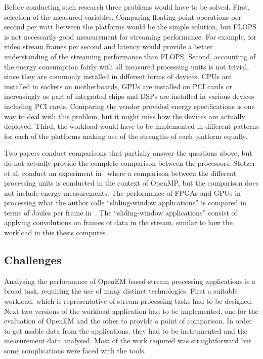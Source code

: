 Before conducting such research three problems would have to be solved. First, selection of the measured variables. Comparing floating point operations per second per watt between the platforms would be the simple solution, but FLOPS is not necessarily good measurement for streaming performance. For example, for video stream frames per second and latency would provide a better understanding of the streaming performance than FLOPS. Second, accounting of the energy consumption fairly with all measured processing units is not trivial, since they are commonly installed in different forms of devices. CPUs are installed in sockets on motherboards, GPUs are installed on PCI cards or increasingly as part of integrated chips and DSPs are installed in various devices including PCI cards. Comparing the vendor provided energy specifications is one way to deal with this problem, but it might miss how the devices are actually deployed. Third, the workload would have to be implemented in different patterns for each of the platforms making use of the strengths of each platform equally.

Two papers conduct comparisons that partially answer the questions above, but do not actually provide the complete comparison between the processors. Stotzer et al. conduct an experiment in~\cite{stotzer2013openmp} where a comparison between the different processing units is conducted in the context of OpenMP, but the comparison does not include energy measurements. The performance of FPGAs and GPUs in processing what the author calls ``sliding-window applications'' is compared in terms of Joules per frame in~\cite{fowers2012performance}. The ``sliding-window applications'' consist of applying convolutions on frames of data in the stream, similar to how the workload in this thesis computes.

\subsection{Challenges}
\label{subsec:challenges}
Analysing the performance of OpenEM based stream processing applications is a broad task, requiring the use of many distinct technologies. First a suitable workload, which is representative of stream processing tasks had to be designed. Next two versions of the workload application had to be implemented, one for the evaluation of OpenEM and the other to provide a point of comparison. In order to get usable data from the applications, they had to be instrumented and the measurement data analysed. Most of the work required was straightforward but some complications were faced with the tools.

